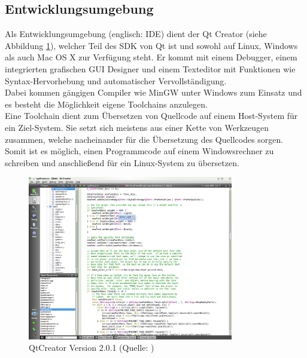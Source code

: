 \subsection{Entwicklungsumgebung}
Als Entwicklungsumgebung (englisch: \ac{IDE}) dient der Qt Creator (siehe Abbildung \ref{QtCreator}), welcher Teil des \ac{SDK} von Qt ist und sowohl auf Linux, Windows als auch Mac OS X zur Verfügung steht. Er kommt mit einem Debugger, einem integrierten grafischen \ac{GUI} Designer und einem Texteditor mit Funktionen wie Syntax-Hervorhebung und automatischer Vervollständigung. \\
Dabei kommen gängigen Compiler wie MinGW unter Windows zum Einsatz und es besteht die Möglichkeit eigene Toolchains anzulegen. \\
Eine Toolchain dient zum Übersetzen von Quellcode auf einem Host-System für ein Ziel-System. Sie setzt sich meistens aus einer Kette von Werkzeugen zusammen, welche nacheinander für die Übersetzung des Quellcodes sorgen. Somit ist es möglich, einen Programmcode auf einem Windowsrechner zu schreiben und anschließend für ein Linux-System zu übersetzen.

\begin{figure}[H]
\begin{center}
\includegraphics[width=0.8\textwidth]{img/general/QtCreator.png}
\caption{QtCreator Version 2.0.1 (Quelle: \protect\cite{qtcreator})}
\label{QtCreator}
\end{center}
\end{figure}



